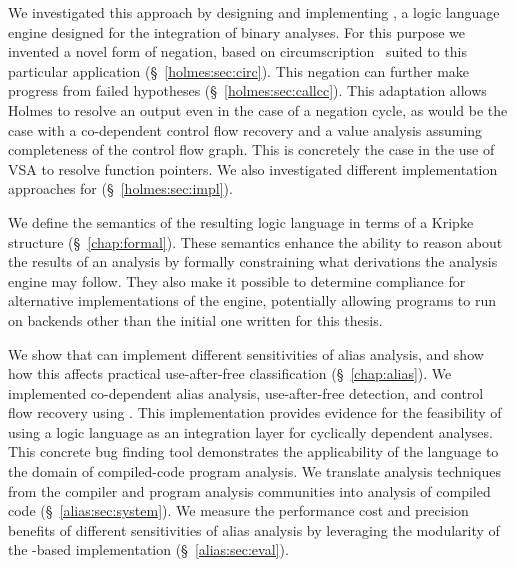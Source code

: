 We investigated this approach by designing and implementing \sysname, a logic language engine designed for the integration of binary analyses.
For this purpose we invented a novel form of negation, based on circumscription~\cite{circumscription} suited to this particular application (\S~\ref{holmes:sec:circ}).
This negation can further make progress from failed hypotheses (\S~\ref{holmes:sec:callcc}).
This adaptation allows Holmes to resolve an output even in the case of a negation cycle, as would be the case with a co-dependent control flow recovery and a value analysis assuming completeness of the control flow graph.
This is concretely the case in the use of VSA to resolve function pointers.
We also investigated different implementation approaches for \sysname (\S~\ref{holmes:sec:impl}).

We define the semantics of the resulting logic language in terms of a Kripke structure (\S~\ref{chap:formal}).
These semantics enhance the ability to reason about the results of an analysis by formally constraining what derivations the analysis engine may follow.
They also make it possible to determine compliance for alternative implementations of the engine, potentially allowing programs to run on backends other than the initial one written for this thesis.

We show that \sysname can implement different sensitivities of alias analysis, and show how this affects practical use-after-free classification (\S~\ref{chap:alias}).
We implemented co-dependent alias analysis, use-after-free detection, and control flow recovery using \sysname.
This implementation provides evidence for the feasibility of using a logic language as an integration layer for cyclically dependent analyses.
This concrete bug finding tool demonstrates the applicability of the \sysname language to the domain of compiled-code program analysis.
We translate analysis techniques from the compiler and program analysis communities into analysis of compiled code (\S~\ref{alias:sec:system}).
We measure the performance cost and precision benefits of different sensitivities of alias analysis by leveraging the modularity of the \sysname-based implementation (\S~\ref{alias:sec:eval}).

